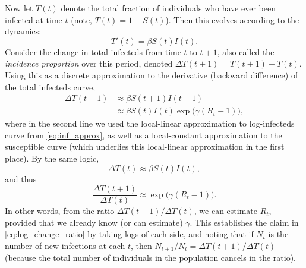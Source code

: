 \documentclass[sts]{imsart}
\theoremstyle{plain}
\theoremstyle{definition}
\theoremstyle{remark}
\begin{document}
\begin{appendix}
Now let $T(t)$ denote the total fraction of individuals who have ever been
infected at time $t$ (note, $T(t) = 1-S(t)$). Then this evolves according to the 
dynamics: 
$$
T'(t) = \beta S(t) I(t).
$$
Consider the change in total infecteds from time $t$ to $t+1$, also called the
\emph{incidence proportion} over this period, denoted $\Delta T(t+1) = T(t+1) - 
T(t)$. Using this as a discrete approximation to the derivative (backward
difference) of the total infecteds curve, 
\begin{align*}
\Delta T(t+1) &\approx \beta S(t+1) I(t+1) \\
&\approx \beta S(t) I(t) \exp\big(\gamma (R_t - 1)\big),
\end{align*}
where in the second line we used the local-linear approximation to log-infecteds
curve from \eqref{eq:inf_approx}, as well as a local-constant approximation to
the susceptible curve (which underlies this local-linear approximation in the
first place). By the same logic,  
$$
\Delta T(t) \approx \beta S(t) I(t),
$$
and thus 
$$
\frac{\Delta T(t+1)}{\Delta T(t)} \approx \exp\big(\gamma (R_t - 1)\big). 
$$
In other words, from the ratio $\Delta T(t+1) / \Delta T(t)$, we can estimate
$R_t$, provided that we already know (or can estimate) $\gamma$. This
establishes the claim in \eqref{eq:log_change_ratio} by taking logs of each
side, and noting that if $N_t$ is the number of new infections at each $t$, then
$N_{t+1} / N_t = \Delta T(t+1) / \Delta T(t)$ (because the total number of
individuals in the population cancels in the ratio).
\end{appendix}


      
\end{document}
